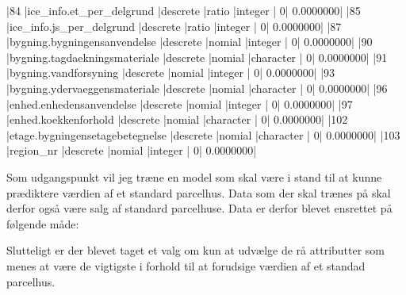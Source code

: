 \documentclass{report}
\begin{document}
\begin{Schunk}
\begin{Soutput}
|84  |ice_info.et_per_delgrund                                      |descrete           |ratio          |integer         |              0|          0.0000000|
|85  |ice_info.js_per_delgrund                                      |descrete           |ratio          |integer         |              0|          0.0000000|
|87  |bygning.bygningensanvendelse                                  |descrete           |nomial         |integer         |              0|          0.0000000|
|90  |bygning.tagdaekningsmateriale                                 |descrete           |nomial         |character       |              0|          0.0000000|
|91  |bygning.vandforsyning                                         |descrete           |nomial         |integer         |              0|          0.0000000|
|93  |bygning.ydervaeggensmateriale                                 |descrete           |nomial         |character       |              0|          0.0000000|
|96  |enhed.enhedensanvendelse                                      |descrete           |nomial         |integer         |              0|          0.0000000|
|97  |enhed.koekkenforhold                                          |descrete           |nomial         |character       |              0|          0.0000000|
|102 |etage.bygningensetagebetegnelse                               |descrete           |nomial         |character       |              0|          0.0000000|
|103 |region_nr                                                     |descrete           |nomial         |integer         |              0|          0.0000000|
\end{Soutput}
\end{Schunk}

Som udgangspunkt vil jeg træne en model som skal være i stand til at kunne prædiktere værdien af et standard
parcelhus. Data som der skal trænes på skal derfor også være salg af standard parcelhuse.
Data er derfor blevet ensrettet på følgende måde:


Slutteligt er der blevet taget et valg om kun at udvælge de rå attributter som menes at være de
vigtigste i forhold til at forudsige værdien af et standad parcelhus.
\end{document}
